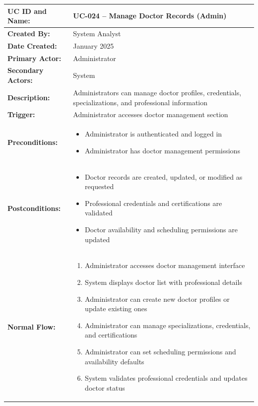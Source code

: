 \documentclass[12pt,a4paper]{article}
\begin{document}
\renewcommand{\arraystretch}{1.5}
\begin{longtable}{|p{4.5cm}|p{10.5cm}|}
\hline
\textbf{UC ID and Name:} & UC-024 – Manage Doctor Records (Admin) \\
\hline
\textbf{Created By:} & System Analyst \\
\hline
\textbf{Date Created:} & January 2025 \\
\hline
\textbf{Primary Actor:} & Administrator \\
\hline
\textbf{Secondary Actors:} & System \\
\hline
\textbf{Description:} & Administrators can manage doctor profiles, credentials, specializations, and professional information \\
\hline
\textbf{Trigger:} & Administrator accesses doctor management section \\
\hline
\textbf{Preconditions:} &
\begin{itemize}
  \item Administrator is authenticated and logged in
  \item Administrator has doctor management permissions
\end{itemize} \\
\hline
\textbf{Postconditions:} &
\begin{itemize}
  \item Doctor records are created, updated, or modified as requested
  \item Professional credentials and certifications are validated
  \item Doctor availability and scheduling permissions are updated
\end{itemize} \\
\hline
\textbf{Normal Flow:} &
\begin{enumerate}
  \item Administrator accesses doctor management interface
  \item System displays doctor list with professional details
  \item Administrator can create new doctor profiles or update existing ones
  \item Administrator can manage specializations, credentials, and certifications
  \item Administrator can set scheduling permissions and availability defaults
  \item System validates professional credentials and updates doctor status
\end{enumerate} \\

\end{longtable}
\end{document}
